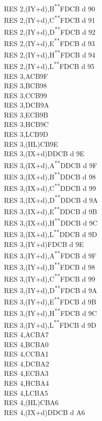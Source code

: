 \documentclass[12pt,twoside,openright,a4paper]{book}
\newcommand{\UNDOC}{\textnormal{\textsuperscript{**}}}
\begin{document}
\begin{multicols}{3}
{\begin{tabbing}
		RES 2,(IY+d),B\UNDOC\>FDCB d 90\\
		RES 2,(IY+d),C\UNDOC\>FDCB d 91\\
		RES 2,(IY+d),D\UNDOC\>FDCB d 92\\
		RES 2,(IY+d),E\UNDOC\>FDCB d 93\\
		RES 2,(IY+d),H\UNDOC\>FDCB d 94\\
		RES 2,(IY+d),L\UNDOC\>FDCB d 95\\
		RES 3,A\>CB9F\\
		RES 3,B\>CB98\\
		RES 3,C\>CB99\\
		RES 3,D\>CB9A\\
		RES 3,E\>CB9B\\
		RES 3,H\>CB9C\\
		RES 3,L\>CB9D\\
		RES 3,(HL)\>CB9E\\
		RES 3,(IX+d)\>DDCB d 9E\\
		RES 3,(IX+d),A\UNDOC\>DDCB d 9F\\
		RES 3,(IX+d),B\UNDOC\>DDCB d 98\\
		RES 3,(IX+d),C\UNDOC\>DDCB d 99\\
		RES 3,(IX+d),D\UNDOC\>DDCB d 9A\\
		RES 3,(IX+d),E\UNDOC\>DDCB d 9B\\
		RES 3,(IX+d),H\UNDOC\>DDCB d 9C\\
		RES 3,(IX+d),L\UNDOC\>DDCB d 9D\\
		RES 3,(IY+d)\>FDCB d 9E\\
		RES 3,(IY+d),A\UNDOC\>FDCB d 9F\\
		RES 3,(IY+d),B\UNDOC\>FDCB d 98\\
		RES 3,(IY+d),C\UNDOC\>FDCB d 99\\
		RES 3,(IY+d),D\UNDOC\>FDCB d 9A\\
		RES 3,(IY+d),E\UNDOC\>FDCB d 9B\\
		RES 3,(IY+d),H\UNDOC\>FDCB d 9C\\
		RES 3,(IY+d),L\UNDOC\>FDCB d 9D\\
		RES 4,A\>CBA7\\
		RES 4,B\>CBA0\\
		RES 4,C\>CBA1\\
		RES 4,D\>CBA2\\
		RES 4,E\>CBA3\\
		RES 4,H\>CBA4\\
		RES 4,L\>CBA5\\
		RES 4,(HL)\>CBA6\\
		RES 4,(IX+d)\>DDCB d A6\\

\end{tabbing}}
\end{multicols}
\end{document}
